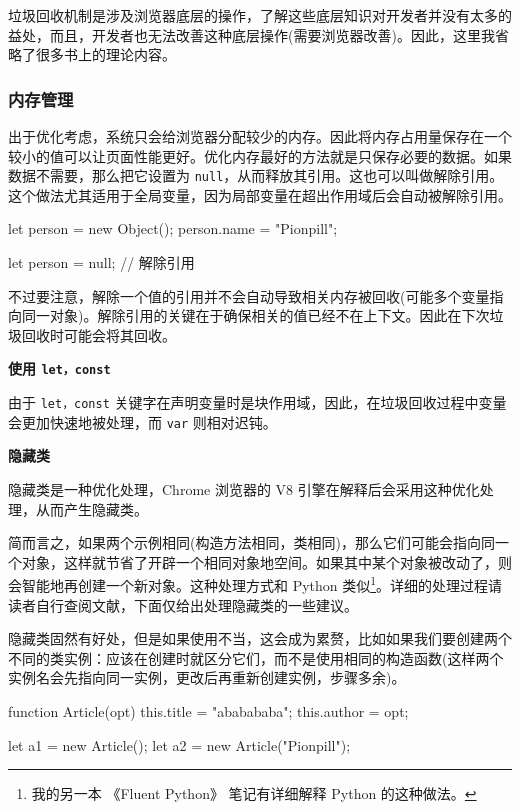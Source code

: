 垃圾回收机制是涉及浏览器底层的操作，了解这些底层知识对开发者并没有太多的益处，而且，开发者也无法改善这种底层操作(需要浏览器改善)。因此，这里我省略了很多书上的理论内容。

\subsubsection*{内存管理}

出于优化考虑，系统只会给浏览器分配较少的内存。因此将内存占用量保存在一个较小的值可以让页面性能更好。优化内存最好的方法就是只保存必要的数据。如果数据不需要，那么把它设置为 \texttt{null}，从而释放其引用。这也可以叫做解除引用。这个做法尤其适用于全局变量，因为局部变量在超出作用域后会自动被解除引用。

\begin{JavaScript}
let person = new Object();
person.name = "Pionpill";

let person = null;      // 解除引用
\end{JavaScript}

不过要注意，解除一个值的引用并不会自动导致相关内存被回收(可能多个变量指向同一对象)。解除引用的关键在于确保相关的值已经不在上下文。因此在下次垃圾回收时可能会将其回收。

\noindent\textbf{使用 \texttt{let，const}}

由于 \texttt{let，const} 关键字在声明变量时是块作用域，因此，在垃圾回收过程中变量会更加快速地被处理，而 \texttt{var} 则相对迟钝。

\noindent\textbf{隐藏类}

隐藏类是一种优化处理，Chrome 浏览器的 V8 引擎在解释后会采用这种优化处理，从而产生隐藏类。

简而言之，如果两个示例相同(构造方法相同，类相同)，那么它们可能会指向同一个对象，这样就节省了开辟一个相同对象地空间。如果其中某个对象被改动了，则会智能地再创建一个新对象。这种处理方式和 Python 类似\footnote{我的另一本 《Fluent Python》 笔记有详细解释 Python 的这种做法。}。详细的处理过程请读者自行查阅文献，下面仅给出处理隐藏类的一些建议。

隐藏类固然有好处，但是如果使用不当，这会成为累赘，比如如果我们要创建两个不同的类实例：应该在创建时就区分它们，而不是使用相同的构造函数(这样两个实例名会先指向同一实例，更改后再重新创建实例，步骤多余)。

\begin{JavaScript}
function Article(opt) {
    this.title = "ababababa";
    this.author = opt;
}

let a1 = new Article();
let a2 = new Article("Pionpill");
\end{JavaScript}

